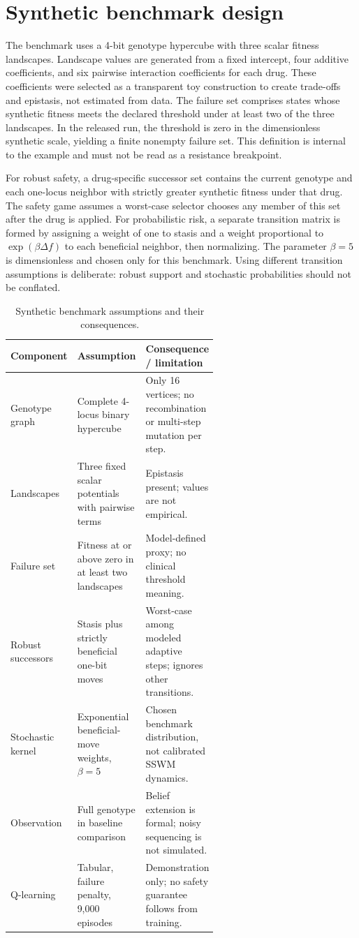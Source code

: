 \documentclass[11pt]{article}
\theoremstyle{definition}\newtheorem{definition}[proposition]{Definition}\theoremstyle{remark}\newtheorem{remark}[proposition]{Remark}
\begin{document}
\section{Synthetic benchmark design}
The benchmark uses a 4-bit genotype hypercube with three scalar fitness landscapes. Landscape values are generated from a fixed intercept, four additive coefficients, and six pairwise interaction coefficients for each drug. These coefficients were selected as a transparent toy construction to create trade-offs and epistasis, not estimated from data. The failure set comprises states whose synthetic fitness meets the declared threshold under at least two of the three landscapes. In the released run, the threshold is zero in the dimensionless synthetic scale, yielding a finite nonempty failure set. This definition is internal to the example and must not be read as a resistance breakpoint.

For robust safety, a drug-specific successor set contains the current genotype and each one-locus neighbor with strictly greater synthetic fitness under that drug. The safety game assumes a worst-case selector chooses any member of this set after the drug is applied. For probabilistic risk, a separate transition matrix is formed by assigning a weight of one to stasis and a weight proportional to $\exp(\beta\Delta f)$ to each beneficial neighbor, then normalizing. The parameter $\beta=5$ is dimensionless and chosen only for this benchmark. Using different transition assumptions is deliberate: robust support and stochastic probabilities should not be conflated.

\begin{table}[htbp]\centering\small\caption{Synthetic benchmark assumptions and their consequences.}\label{tab:assumptions}\begin{tabularx}{\linewidth}{p{0.25\linewidth}p{0.34\linewidth}X}\toprule Component & Assumption & Consequence / limitation\\\midrule Genotype graph & Complete 4-locus binary hypercube & Only 16 vertices; no recombination or multi-step mutation per step.\\ Landscapes & Three fixed scalar potentials with pairwise terms & Epistasis present; values are not empirical.\\ Failure set & Fitness at or above zero in at least two landscapes & Model-defined proxy; no clinical threshold meaning.\\ Robust successors & Stasis plus strictly beneficial one-bit moves & Worst-case among modeled adaptive steps; ignores other transitions.\\ Stochastic kernel & Exponential beneficial-move weights, $\beta=5$ & Chosen benchmark distribution, not calibrated SSWM dynamics.\\ Observation & Full genotype in baseline comparison & Belief extension is formal; noisy sequencing is not simulated.\\ Q-learning & Tabular, failure penalty, 9,000 episodes & Demonstration only; no safety guarantee follows from training.\\\bottomrule\end{tabularx}\end{table}
\end{document}
